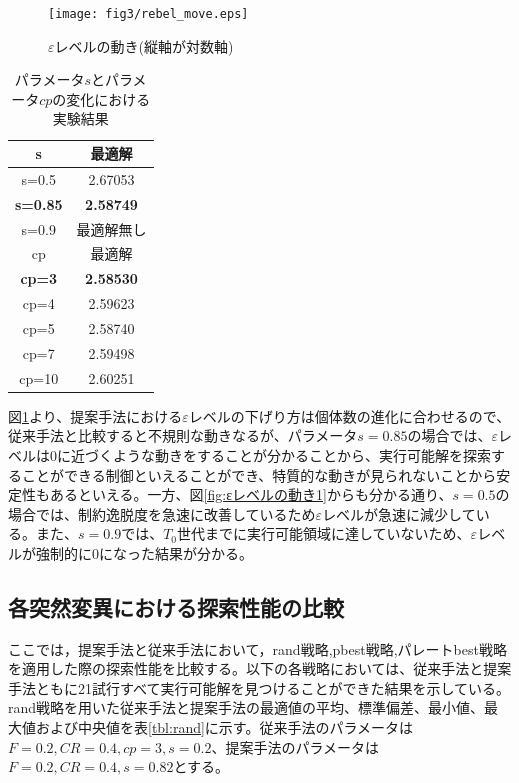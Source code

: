 \documentclass[a4paper,12pt]{jsreport}
\begin{document}
\begin{figure}[htbp]
  \centering
  \texttt{[image: fig3/rebel\_move.eps]}
  \caption{$\varepsilon$レベルの動き(縦軸が対数軸)}
  \label{fig:εレベルの動き}
\end{figure}

\begin{table}[htbp]
\begin{center}
\caption{パラメータ$s$とパラメータ$cp$の変化における実験結果}
\label{tbl:s_cp}
\begin{tabular}{|c|c|}
\hline
 s  & 最適解 \\ \hline
 s=0.5 & 2.67053	\\ \hline
 \bf s=0.85 & \bf2.58749 \\ \hline
 s=0.9 & 最適解無し \\ \hline\hline
 cp & 最適解 \\ \hline
 \bf cp=3 & \bf2.58530	\\ \hline
 cp=4 & 2.59623\\ \hline
 cp=5 & 2.58740 \\ \hline
 cp=7 & 2.59498	\\ \hline
 cp=10 & 2.60251 \\ \hline
\end{tabular}
\end{center}
\end{table}

図\ref{fig:εレベルの動き}より、提案手法における$\varepsilon$レベルの下げり方は個体数の進化に合わせるので、従来手法と比較すると不規則な動きなるが、パラメータ$s=0.85$の場合では、$\varepsilon$レベルは0に近づくような動きをすることが分かることから、実行可能解を探索することができる制御といえることができ、特質的な動きが見られないことから安定性もあるといえる。一方、図\ref{fig:εレベルの動き1}からも分かる通り、$s=0.5$の場合では、制約逸脱度を急速に改善しているため$\varepsilon$レベルが急速に減少している。また、$s=0.9$では、$T_{0}$世代までに実行可能領域に達していないため、$\varepsilon$レベルが強制的に0になった結果が分かる。


\subsection{各突然変異における探索性能の比較}
ここでは，提案手法と従来手法において，rand戦略,pbest戦略,パレートbest戦略を適用した際の探索性能を比較する。以下の各戦略においては、従来手法と提案手法ともに21試行すべて実行可能解を見つけることができた結果を示している。
rand戦略を用いた従来手法と提案手法の最適値の平均、標準偏差、最小値、最大値および中央値を表\ref{tbl:rand}に示す。従来手法のパラメータは$F=0.2,CR=0.4,cp=3,s=0.2$、提案手法のパラメータは$F=0.2,CR=0.4,s=0.82$とする。
\end{document}
